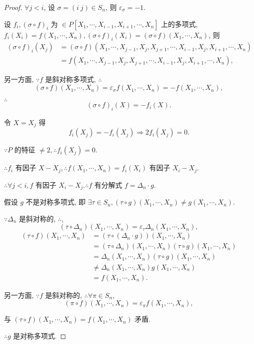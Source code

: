 \documentclass[color=black,device=normal,lang=cn,mode=geye]{elegantnote}
\begin{document}
\begin{proof}
    $\forall j<i$, 设 $\sigma=(i\ j)\in S_n$, 则 $\varepsilon_\sigma=-1$.

    设 $f_i,(\sigma\circ f)_i$ 为 $\in P[X_1,\cdots,X_{i-1},X_{i+1},\cdots,X_n]$ 上的多项式, $f_i(X_i)=f(X_1,\cdots,X_n),(\sigma\circ f)_i(X_i)=(\sigma\circ f)(X_1,\cdots,X_n)$, 则
    \begin{align*}
        (\sigma\circ f)_i(X_j) & =(\sigma\circ f)(X_1,\cdots,X_{j-1},X_j,X_{j+1},\cdots,X_{i-1},X_j,X_{i+1},\cdots,X_n) \\
        & =f(X_1,\cdots,X_{j-1},X_j,X_{j+1},\cdots,X_{i-1},X_j,X_{i+1},\cdots,X_n),
    \end{align*}

    另一方面, $\because f$ 是斜对称多项式, $\therefore$
    \[(\sigma\circ f)(X_1,\cdots,X_n)=\varepsilon_\sigma f(X_1,\cdots,X_n)=-f(X_1,\cdots,X_n),\]

    $\therefore$
    \[(\sigma\circ f)_i(X)=-f_i(X).\]

    令 $X=X_j$ 得
    \[f_i(X_j)=-f_i(X_j)\Rightarrow2f_i(X_j)=0.\]

    $\because P$ 的特征 $\neq2,\therefore f_i(X_j)=0$.

    $\therefore f_i$ 有因子 $X-X_j,\therefore f(X_1,\cdots,X_n)=f_i(X_i)$ 有因子 $X_i-X_j$.

    $\therefore\forall j<i,f$ 有因子 $X_i-X_j.\therefore f$ 有分解式 $f=\Delta_n\cdot g$.

    假设 $g$ 不是对称多项式, 即 $\exists\tau\in S_n,(\tau\circ g)(X_1,\cdots,X_n)\neq g(X_1,\cdots,X_n)$.

    $\because\Delta_n$ 是斜对称的, $\therefore$,
    \[(\tau\circ\Delta_n)(X_1,\cdots,X_n)=\varepsilon_\tau\Delta_n(X_1,\cdots,X_n),\]
    \begin{align*}
        (\tau\circ f)(X_1,\cdots,X_n) & =(\tau\circ(\Delta_n\cdot g))(X_1,\cdots,X_n) \\
        & =(\tau\circ\Delta_n)(X_1,\cdots,X_n)(\tau\circ g)(X_1,\cdots,X_n) \\
        & =\Delta_n(X_1,\cdots,X_n)(\tau\circ g)(X_1,\cdots,X_n) \\
        & \neq\Delta_n(X_1,\cdots,X_n)g(X_1,\cdots,X_n) \\
        & =f(X_1,\cdots,X_n).
    \end{align*}
    
    另一方面, $\because f$ 是斜对称的, $\therefore\forall\pi\in S_n$,
    \[(\pi\circ f)(X_1,\cdots,X_n)=\varepsilon_\pi f(X_1,\cdots,X_n),\]

    与 $(\tau\circ f)(X_1,\cdots,X_n)=f(X_1,\cdots,X_n)$ 矛盾.

    $\therefore g$ 是对称多项式.
\end{proof}
\end{document}
